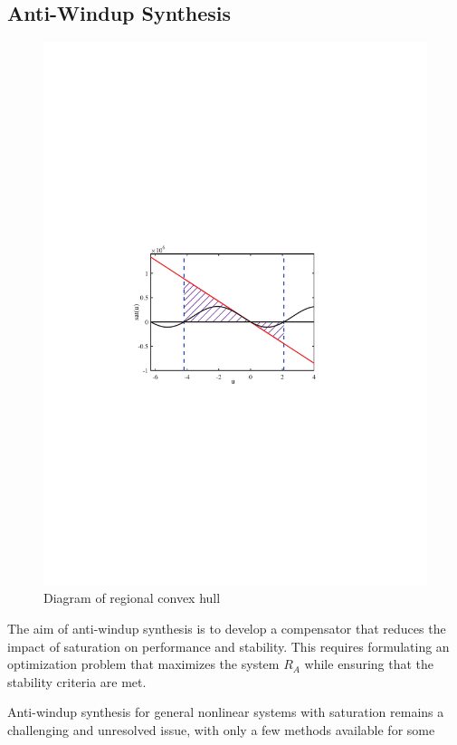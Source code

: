 \documentclass[10pt,final,journal,twoside]{IEEEtran}
\begin{document}
\subsection{Anti-Windup Synthesis}\label{subsec:awsyn}
\begin{figure}[!t]
\centering
\includegraphics[width=1.0\linewidth]{../Diagrams/convexhull.pdf}
\caption{Diagram of regional convex hull}
\label{fig_conv}
\end{figure}
The aim of anti-windup synthesis is to develop a compensator that reduces the impact of saturation on performance and stability. This requires formulating
an optimization problem that maximizes the system $R_A$ while ensuring that the stability criteria are met.\par
Anti-windup synthesis for general nonlinear systems with saturation remains a challenging and unresolved issue, with only a few methods available for some
\end{document}

